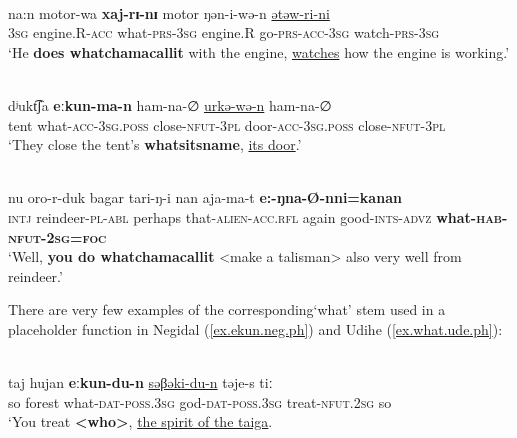 \documentclass[output=paper,colorlinks,citecolor=brown
\ChapterDOI{10.5281/zenodo.15697577}
]{langscibook}
\begin{document}
 \z
{}



 \ea \label{ex.xaj.ulch.1}
 \\
 \gll na:n motor-wa \textbf{xaj-rɪ-nɪ} motor ŋən-i-wə-n \uline{ətəw-ri-ni}\\
 \textsc{3sg} engine.R-\textsc{acc} what-\textsc{prs}-\textsc{3sg} engine.R go-\textsc{prs}-\textsc{acc}-\textsc{3sg} watch-\textsc{prs}-\textsc{3sg}\\
 \glt `He \textbf{does whatchamacallit} with the engine, \uline{watches} how the engine is working.'
 
 \z
{}

 \ea \label{ex.ekun.evk}
 \\
 \gll dʲukt͡ʃa	\textbf{eːkun-ma-n}	ham-na-∅	\uline{urkə-wə-n}	ham-na-∅\\
 tent	what-\textsc{acc}-\textsc{3sg.poss}	close-\textsc{nfut}-3\textsc{pl}	door-\textsc{acc}-\textsc{3sg.poss}	close-\textsc{nfut}-3\textsc{pl}\\
 \glt `They close the tent’s \textbf{whatsitsname}, \uline{its door}.' \\
 \z
{}


 \ea \label{ex.ekun.evk.kanan}
 \\
 \gll nu oro-r-duk bagar tari-ŋ-i nan aja-ma-t \textbf{e:-ŋna-Ø-nni=kanan}\\
\textsc{intj} reindeer-\textsc{pl}-\textsc{abl} perhaps that-\textsc{alien}-\textsc{acc.rfl} again good-\textsc{ints}-\textsc{advz} \textbf{what-\textsc{hab}-\textsc{nfut}-\textsc{2sg}=\textsc{foc}}\\
\glt `Well, \textbf{you do whatchamacallit} <make a talisman> also very well from reindeer.' \\
 \z
{}

There are very few examples of the corresponding`what' stem used in a placeholder function in Negidal (\ref{ex.ekun.neg.ph}) and Udihe (\ref{ex.what.ude.ph}):


 \ea \label{ex.ekun.neg.ph}
 \\
 \gll taj hujan \textbf{eːkun-du-n} \uline{səβəki-du-n} təje-s tiː\\
so forest what-\textsc{dat}-\textsc{poss.3sg} god-\textsc{dat}-\textsc{poss.3sg} treat-\textsc{nfut}.\textsc{2sg} so\\
\glt `You treat \textbf{<who>}, \uline{the spirit of the taiga}.\\
 \z
{}
\end{document}

